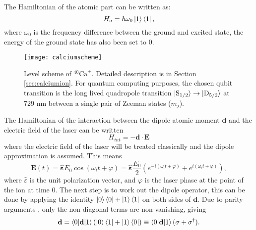 The Hamiltonian of the atomic part can be written as:
\begin{equation}
H_a = \hbar\omega_0 \ket{1}\bra{1},
\end{equation}
where $\omega_0$ is the frequency difference between the ground and excited state, the energy of the ground state has also been set to 0. \begin{figure}
\centering
\texttt{[image: calciumscheme]}
\caption{Level scheme of $^{40}\text{Ca}^+$. Detailed description is in Section \ref{sec:calciumion}. For quantum computing purposes, the chosen qubit transition is the long lived quadropole transition $\ket{\text{S}_{1/2}} \to \ket{\text{D}_{5/2}}$ at 729 nm between a single pair of Zeeman states ($m_j$).}
\label{qubitschemereference}
\end{figure}
The Hamiltonian of the interaction between the dipole atomic moment $\mathbf{d}$ and the electric field of the laser can be written \cite{steck}
\begin{equation}
H_{int} = -\mathbf{d}\cdot \mathbf{E}
\end{equation}
where the electric field of the laser  will be treated classically and the dipole approximation is assumed. This means
\begin{equation}
\mathbf{E}(t) = \hat{\mathbf{\varepsilon}} E_0 \cos(\omega_l t+\varphi) = \hat{\mathbf{\varepsilon}} \frac{E_0}{2} \left(e^{-i(\omega_l t+\varphi)} + e^{i(\omega_l t+\varphi)}\right),
\end{equation}
where $\hat{\varepsilon}$ is the unit polarization vector, and $\varphi$ is the laser phase at the point of the ion at time 0. The next step is to work out the dipole operator, this can be done by applying the identity $\ket{0}\bra{0} + \ket{1}\bra{1}$ on both sides of $\mathbf{d}$. Due to parity arguments \cite{steck}, only the non diagonal terms are non-vanishing, giving
\begin{equation}
\mathbf{d} = \braket{0|\mathbf{d}|1}\left(\ket{0}\bra{1} + \ket{1}\bra{0}\right) \equiv \braket{0|\mathbf{d}|1}(\sigma + \sigma^\dagger).
\end{equation}

